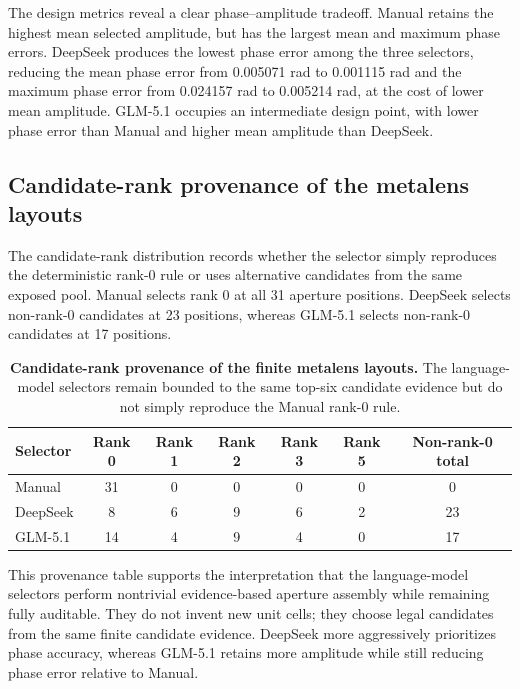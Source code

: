 \documentclass[final,1p,times]{elsarticle}
\begin{document}
The design metrics reveal a clear phase--amplitude tradeoff. Manual retains the highest mean selected amplitude, but has the largest mean and maximum phase errors. DeepSeek produces the lowest phase error among the three selectors, reducing the mean phase error from 0.005071 rad to 0.001115 rad and the maximum phase error from 0.024157 rad to 0.005214 rad, at the cost of lower mean amplitude. GLM-5.1 occupies an intermediate design point, with lower phase error than Manual and higher mean amplitude than DeepSeek.

\subsection{Candidate-rank provenance of the metalens layouts}

The candidate-rank distribution records whether the selector simply reproduces the deterministic rank-0 rule or uses alternative candidates from the same exposed pool. Manual selects rank 0 at all 31 aperture positions. DeepSeek selects non-rank-0 candidates at 23 positions, whereas GLM-5.1 selects non-rank-0 candidates at 17 positions.

\begin{table}[htbp!]
\centering
\caption{\textbf{Candidate-rank provenance of the finite metalens layouts.}
The language-model selectors remain bounded to the same top-six candidate evidence but do not simply reproduce the Manual rank-0 rule.}
\label{tab:si_phase6_metalens_ranks}
\small
\setlength{\tabcolsep}{5pt}
\renewcommand{\arraystretch}{1.12}
\begin{tabular}{lcccccc}
\toprule
Selector & Rank 0 & Rank 1 & Rank 2 & Rank 3 & Rank 5 & Non-rank-0 total \\
\midrule
Manual & 31 & 0 & 0 & 0 & 0 & 0 \\
DeepSeek & 8 & 6 & 9 & 6 & 2 & 23 \\
GLM-5.1 & 14 & 4 & 9 & 4 & 0 & 17 \\
\bottomrule
\end{tabular}
\end{table}

This provenance table supports the interpretation that the language-model selectors perform nontrivial evidence-based aperture assembly while remaining fully auditable. They do not invent new unit cells; they choose legal candidates from the same finite candidate evidence. DeepSeek more aggressively prioritizes phase accuracy, whereas GLM-5.1 retains more amplitude while still reducing phase error relative to Manual.
\end{document}

